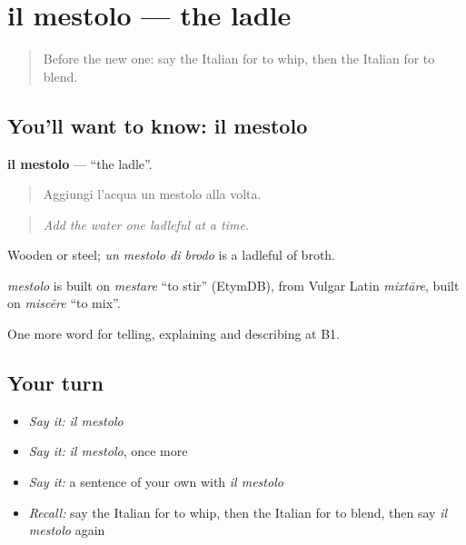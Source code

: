 \section[il mestolo]{il mestolo — the ladle}

\label{lesson:IT-C338-mestolo}



\begin{quote}
Before the new one: say the Italian for to whip, then the Italian for to blend.
\end{quote}

\subsection*{You'll want to know: il mestolo}
\textbf{il mestolo} — \textquotedblleft{}the ladle\textquotedblright{}.

\begin{quote}
Aggiungi l'acqua un mestolo alla volta.
\end{quote}

\begin{quote}
\emph{Add the water one ladleful at a time.}
\end{quote}

Wooden or steel; \emph{un mestolo di brodo} is a ladleful of broth.

\begin{cousinweb}
\emph{mestolo} is built on \emph{mestare} \textquotedblleft{}to stir\textquotedblright{} (EtymDB), from Vulgar Latin \emph{mixtāre}, built on \emph{miscēre} \textquotedblleft{}to mix\textquotedblright{}.
\end{cousinweb}

\begin{grammarlens}[title={What you've built}]
One more word for telling, explaining and describing at B1.
\end{grammarlens}

\subsection*{Your turn}
\begin{itemize}
\raggedright
  \item \emph{Say it:} \emph{il mestolo}
  \item \emph{Say it:} \emph{il mestolo}, once more
  \item \emph{Say it:} a sentence of your own with \emph{il mestolo}
  \item \emph{Recall:} say the Italian for to whip, then the Italian for to blend, then say \emph{il mestolo} again
\end{itemize}

